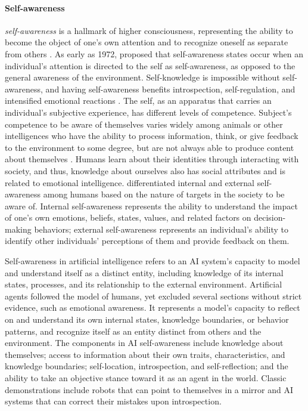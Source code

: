 \paragraph{Self-awareness}
 \textit{self-awareness} is a hallmark of higher consciousness, representing the ability to become the object of one's own attention and to recognize oneself as separate from others \citep{Morin2006selfawareness}. As early as 1972, \citet{duval1972objective} proposed that self-awareness states occur when an individual's attention is directed to the self as self-awareness, as opposed to the general awareness of the environment. Self-knowledge is impossible without self-awareness, and having self-awareness benefits introspection, self-regulation, and intensified emotional reactions \citep{baumeister2010self}. The self, as an apparatus that carries an individual's subjective experience, has different levels of competence. Subject's competence to be aware of themselves varies widely among animals or other intelligences who have the ability to process information, think, or give feedback to the environment to some degree, but are not always able to produce content about themselves \citep{leary2007curse, Morin2006selfawareness}. Humans learn about their identities through interacting with society, and thus, knowledge about ourselves also has social attributes and is related to emotional intelligence. \citet{eurich2018self} differentiated internal and external self-awareness among humans based on the nature of targets in the society to be aware of. Internal self-awareness represents the ability to understand the impact of one's own emotions, beliefs, states, values, and related factors on decision-making behaviors; external self-awareness represents an individual's ability to identify other individuals' perceptions of them and provide feedback on them. 
 
 Self-awareness in artificial intelligence refers to an AI system's capacity to model and understand itself as a distinct entity, including knowledge of its internal states, processes, and its relationship to the external environment. Artificial agents followed the model of humans, yet excluded several sections without strict evidence, such as emotional awareness. It represents a model's capacity to reflect on and understand its own internal states, knowledge boundaries, or behavior patterns, and recognize itself as an entity distinct from others and the environment. The components in AI self-awareness include knowledge about themselves; access to information about their own traits, characteristics, and knowledge boundaries; self-location, introspection, and self-reflection; and the ability to take an objective stance toward it as an agent in the world. Classic demonstrations include robots that can point to themselves in a mirror and AI systems that can correct their mistakes upon introspection.

